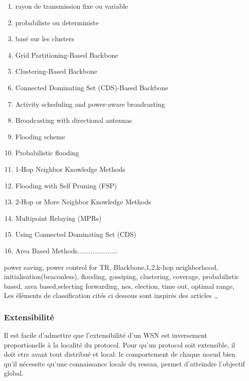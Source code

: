 \begin{enumerate}
 \item  rayon de transmission fixe ou variable
 \item  probabiliste ou deterministe
 \item  basé sur les clusters
 \item  Grid Partitioning-Based Backbone
 \item  Clustering-Based Backbone
 \item  Connected Dominating Set (CDS)-Based Backbone
 \item  Activity scheduling and power-aware broadcasting
 \item  Broadcasting with directional antennas
 \item  Flooding scheme 
 \item  Probabilistic flooding
 \item  1-Hop Neighbor Knowledge Methods
 \item  Flooding with Self Pruning (FSP)
 \item  2-Hop or More Neighbor Knowledge Methods
 \item  Multipoint Relaying (MPRs)
 \item  Using Connected Dominating Set (CDS)
 \item  Area Based Methods.....................
 
\end{enumerate}

power saving, power control for TR, Blackbone,1,2,k-hop neighborhood, initialisation(beaconless), flooding, gossiping, clustering, coverage, probabilistic based, area based,selecting forwarding, nes, election, time out, optimal range,\\


Les éléments de classification cités ci dessous sont inspirés des articles \cite{stojmenovic2004},\cite{ingelrest2005},\cite{wu2003}


\subsubsection{Extensibilité}
Il est facile d'admettre que l'extensibilité d'un WSN est inversement proportionelle à la localité du protocol. Pour qu'un protocol soit extensible, il doit etre avant tout distribué et local: le comportement de chaque noeud bien qu'il
nécessite qu'une connaissance locale du reseau, permet d'atteindre l'objectif global. 


